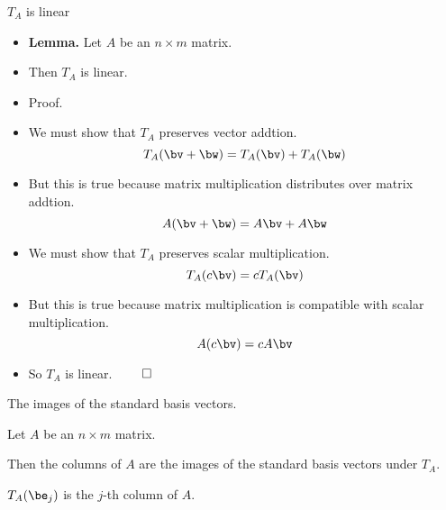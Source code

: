 \documentclass{beamer}
\begin{document}
\begin{frame}{$T_A$ is linear}

\begin{itemize}
\item \textbf{Lemma.} Let $A$ be an $n\times m$ matrix.
\item Then $T_A$ is linear.
\item Proof.
\item We must show that $T_A$ preserves vector addtion.
$$T_A(\bv + \bw) = T_A(\bv) + T_A(\bw)$$
\item But this is true because matrix multiplication distributes over matrix addtion.
$$A(\bv + \bw) = A\bv + A\bw$$
\item We must show that $T_A$ preserves scalar multiplication.
$$T_A(c \bv) = c T_A(\bv)$$
\item But this is true because matrix multiplication is compatible with scalar multiplication.
$$A(c \bv ) = c A\bv$$
\item So $T_A$ is linear. $\qed$
\end{itemize}
\end{frame}

\beamerdefaultoverlayspecification{}

\begin{frame}{The images of the standard basis vectors.}

\begin{lemma}
Let $A$ be an $n\times m$ matrix.

\pause

\bigskip

Then the columns of $A$ are the
images of the standard basis vectors under $T_A$.

\bigskip


\pause

$T_A(\be_j)$ is the $j$-th column of $A$.
\end{lemma}
\end{frame}

\end{document}
